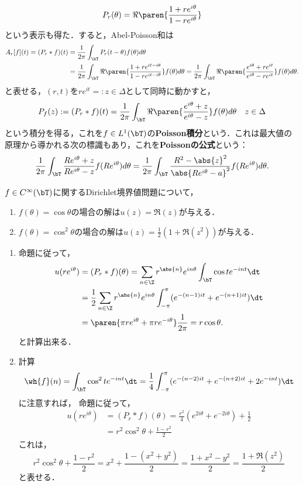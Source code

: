 \documentclass[uplatex,dvipdfmx]{jsreport}
\begin{document}
\begin{remarks}
    \[P_r(\theta)=\Re\paren{\frac{1+re^{i\theta}}{1-re^{i\theta}}}\]
    という表示も得た．すると，Abel-Poisson和は
    \begin{align*}
        A_r[f](t)=(P_r*f)(t)&=\frac{1}{2\pi}\int_\bT P_r(t-\theta)f(\theta)d\theta\\
        &=\frac{1}{2\pi}\int_\bT\Re\paren{\frac{1+re^{it-i\theta}}{1-re^{it-i\theta}}}f(\theta)d\theta=\frac{1}{2\pi}\int_\bT\Re\paren{\frac{e^{i\theta}+re^{it}}{e^{i\theta}-re^{it}}}f(\theta)d\theta.
    \end{align*}
    と表せる，$(r,t)$を$re^{it}=:z\in\Delta$として同時に動かすと，
    \[P_f(z):=(P_r*f)(t)=\frac{1}{2\pi}\int_\bT\Re\paren{\frac{e^{i\theta}+z}{e^{i\theta}-z}}f(\theta)d\theta\quad z\in\Delta\]
    という積分を得る，これを$f\in L^1(\bT)$の\textbf{Poisson積分}という．これは最大値の原理から導かれる次の標識もあり，これを\textbf{Poissonの公式}という：
    \[\frac{1}{2\pi}\int_{\bT}\frac{Re^{i\theta}+z}{Re^{i\theta}-z}f(Re^{i\theta})d\theta=\frac{1}{2\pi}\int_\bT\frac{R^2-\abs{z}^2}{\abs{Re^{i\theta}-a}^2}f(Re^{i\theta})d\theta.\]
\end{remarks}

\begin{proposition}
    $f\in C^\infty(\bT)$に関するDirichlet境界値問題について，
    \begin{enumerate}
        \item $f(\theta)=\cos\theta$の場合の解は$u(z)=\Re(z)$が与える．
        \item $f(\theta)=\cos^2\theta$の場合の解は$u(z)=\frac{1}{2}(1+\Re(z^2))$が与える．
    \end{enumerate}
\end{proposition}
\begin{Proof}\mbox{}
    \begin{enumerate}
        \item 命題に従って，
        \begin{align*}
            u(re^{i\theta})&=(P_r*f)(\theta)=\sum_{n\in\Z}r^{\abs{n}}e^{in\theta}\int_\bT\cos te^{-int}\dt\\
            &=\frac{1}{2}\sum_{n\in\Z}r^{\abs{n}}e^{in\theta}\int^\pi_{-\pi}(e^{-(n-1)it}+e^{-(n+1)it})\dt\\
            &=\paren{\pi re^{i\theta}+\pi re^{-i\theta}}\frac{1}{2\pi}=r\cos\theta.
        \end{align*}
        と計算出来る．
        \item 計算
        \[\wh{f}(n)=\int_\bT\cos^2te^{-int}\dt=\frac{1}{4}\int^\pi_{-\pi}(e^{-(n-2)it}+e^{-(n+2)it}+2e^{-int})\dt\]
        に注意すれば，
        命題に従って，
        \begin{align*}
            u(re^{i\theta})&=(P_r*f)(\theta)=\frac{r^2}{4}(e^{2i\theta}+e^{-2i\theta})+\frac{1}{2}\\
            &=r^2\cos^2\theta+\frac{1-r^2}{2}
        \end{align*}
        これは，
        \[r^2\cos^2\theta+\frac{1-r^2}{2}=x^2+\frac{1-(x^2+y^2)}{2}=\frac{1+x^2-y^2}{2}=\frac{1+\Re(z^2)}{2}\]
        と表せる．
    \end{enumerate}
\end{Proof}
\end{document}

